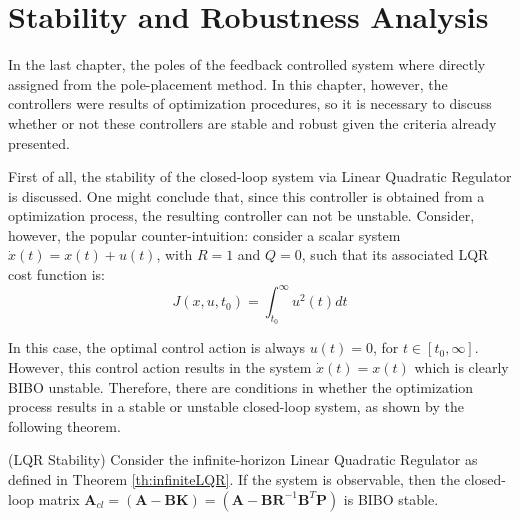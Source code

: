 \documentclass[a4paper,11pt]{book}
\numberwithin{figure}{chapter}
\numberwithin{equation}{chapter}
\numberwithin{table}{chapter}
\newtheorem{theorem}{Theorem}[chapter]
\theoremstyle{definition}
\newcounter{boxed-theorem}
\newenvironment{boxed-theorem}[1]
{\begin{shaded} \begin{theorem}{#1}}
{\end{theorem} \end{shaded}}
\newcounter{boxed-definition}
\begin{document}
\section{Stability and Robustness Analysis}

In the last chapter, the poles of the feedback controlled system where directly assigned from the pole-placement method. In this chapter, however, the controllers were results of optimization procedures, so it is necessary to discuss whether or not these controllers are stable and robust given the criteria already presented. 

First of all, the stability of the closed-loop system via Linear Quadratic Regulator is discussed. One might conclude that, since this controller is obtained from a optimization process, the resulting controller can not be unstable. Consider, however, the popular counter-intuition: consider a scalar system $\dot{x}(t) = x(t) + u(t)$, with $R = 1$ and $Q = 0$, such that its associated LQR cost function is:
\begin{equation}
	J(x,u,t_0) = \int_{t_0}^{\infty} u^2(t) dt
\end{equation}

\noindent In this case, the optimal control action is always $u(t) = 0$, for $t \in [t_0, \infty]$. However, this control action results in the system $\dot{x}(t) = x(t)$ which is clearly BIBO unstable. Therefore, there are conditions in whether the optimization process results in a stable or unstable closed-loop system, as shown by the following theorem.

\begin{boxed-theorem}{(LQR Stability)} \label{th:lqrStab}
	Consider the infinite-horizon Linear Quadratic Regulator as defined in Theorem \ref{th:infiniteLQR}. If the system is observable, then the closed-loop matrix $\bm{A}_{cl} = (\bm{A} - \bm{B}\bm{K}) = (\bm{A} - \bm{B}\bm{R}^{-1}\bm{B}^T\bm{P})$ is BIBO stable.
\end{boxed-theorem}
\end{document}

